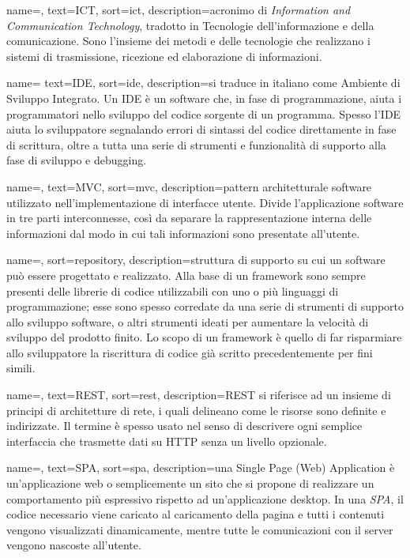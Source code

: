 {
	name=,
	text=ICT,
	sort=ict,
	description={acronimo di \emph{Information and Communication Technology}, tradotto in Tecnologie dell’informazione e della comunicazione. Sono l'insieme dei metodi e delle tecnologie che realizzano i sistemi di trasmissione, ricezione ed elaborazione di informazioni.}
}

{
	name=
	text=IDE,
	sort=ide,
	description={si traduce in italiano come Ambiente di Sviluppo Integrato. Un IDE è un software che, in fase di programmazione, aiuta i programmatori nello sviluppo del codice sorgente di un programma. Spesso l'IDE aiuta lo sviluppatore segnalando errori di sintassi del codice direttamente in fase di scrittura, oltre a tutta una serie di strumenti e funzionalità di supporto alla fase di sviluppo e debugging.}
}

{
	name=,
	text=MVC,
	sort=mvc,
	description={pattern architetturale software utilizzato nell'implementazione di interfacce utente. Divide l'applicazione software in tre parti interconnesse, così da separare la rappresentazione interna delle informazioni dal modo in cui tali informazioni sono presentate all'utente.}
}



{
	name=,
	sort=repository,
	description={struttura di supporto su cui un software può essere progettato e realizzato. Alla base di un framework sono sempre presenti delle librerie di codice utilizzabili con uno o più linguaggi di programmazione; esse sono spesso corredate da una serie di strumenti di supporto allo sviluppo software, o altri strumenti ideati per aumentare la velocità di sviluppo del prodotto finito. Lo scopo di un framework è quello di far risparmiare allo sviluppatore la riscrittura di codice già scritto precedentemente per fini simili.}
}

{
	name=,
	text=REST,
	sort=rest,
	description={REST si riferisce ad un insieme di principi di architetture di rete, i quali delineano come le risorse sono definite e indirizzate. Il termine è spesso usato nel senso di descrivere ogni semplice interfaccia che trasmette dati su HTTP senza un livello opzionale.}
}

{
	name=,
	text=SPA,
	sort=spa,
	description={una Single Page (Web) Application è un'applicazione web o semplicemente un sito che si propone di realizzare un comportamento più espressivo rispetto ad un'applicazione desktop. In una \emph{SPA}, il codice necessario viene caricato al caricamento della pagina e tutti i contenuti vengono visualizzati dinamicamente, mentre tutte le comunicazioni con il server vengono nascoste all'utente.}
}


